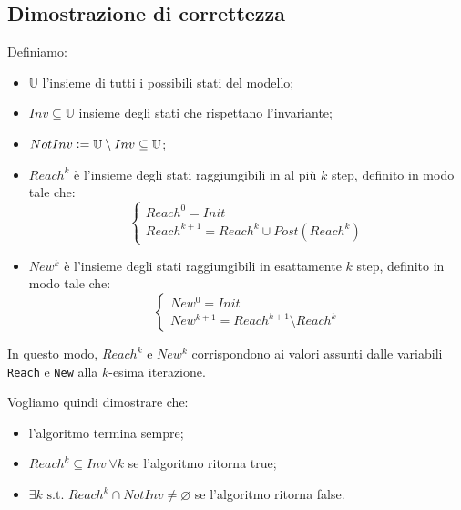 \documentclass[12pt]{article}
\begin{document}
    \subsection{Dimostrazione di correttezza}
    Definiamo:
    \begin{itemize}
        \item $\mathbb U$ l'insieme di tutti i possibili stati del modello;
        \item $Inv \subseteq \mathbb U$ insieme degli stati che rispettano l'invariante;
        \item $NotInv \vcentcolon= \mathbb U \setminus Inv \subseteq \mathbb U$;
        \item $Reach^k$ è l'insieme degli stati raggiungibili in al più $k$ step, definito in modo tale che:
        $$
            \begin{cases}
                Reach^0 = Init \\
                Reach^{k + 1} = Reach^k \cup Post(Reach^k)
            \end{cases}
        $$
        \item $New^k$ è l'insieme degli stati raggiungibili in esattamente $k$ step, definito in modo tale che:
        $$
            \begin{cases}
                New^0 = Init \\
                New^{k + 1} = Reach^{k+1} \setminus Reach^k
            \end{cases}
        $$
    \end{itemize}
    In questo modo, $Reach^k$ e $New^k$ corrispondono ai valori assunti dalle variabili \texttt{Reach} e \texttt{New} alla $k$-esima iterazione.

    Vogliamo quindi dimostrare che:
    \begin{itemize}
        \item l'algoritmo termina sempre;
        \item $Reach^k \subseteq Inv\ \forall k$ se l'algoritmo ritorna true;
        \item $\exists k \mbox{ s.t. } Reach^k \cap NotInv \neq \varnothing$ se l'algoritmo ritorna false.
    \end{itemize}

\end{document}
